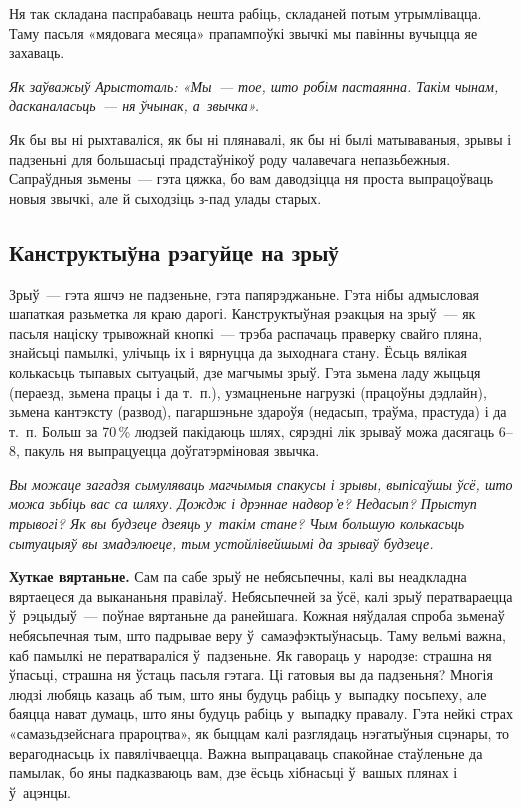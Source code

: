 Ня так складана паспрабаваць нешта рабіць, складаней потым утрымлівацца. Таму пасьля «мядовага месяца» прапампоўкі звычкі мы павінны вучыцца яе захаваць.

\emph{Як заўважыў Арыстоталь: «Мы~--- тое, што робім пастаянна. Такім чынам, дасканаласьць~--- ня ўчынак, а~звычка».}

Як бы вы ні рыхтаваліся, як бы ні плянавалі, як бы ні былі матываваныя, зрывы і падзеньні для большасьці прадстаўнікоў роду чалавечага непазьбежныя. Сапраўдныя зьмены~--- гэта цяжка, бо вам даводзіцца ня проста выпрацоўваць новыя звычкі, але й сыходзіць з-пад улады старых.

\subsection*{Канструктыўна рэагуйце на зрыў}

Зрыў~--- гэта яшчэ не падзеньне, гэта папярэджаньне. Гэта нібы адмысловая шапаткая разьметка ля краю дарогі. Канструктыўная рэакцыя на зрыў~--- як пасьля націску трывожнай кнопкі~--- трэба распачаць праверку свайго пляна, знайсьці памылкі, улічыць іх і вярнуцца да зыходнага стану. Ёсьць вялікая колькасьць тыпавых сытуацый, дзе магчымы зрыў. Гэта зьмена ладу жыцьця (пераезд, зьмена працы і да т.~п.), узмацненьне нагрузкі (працоўны дэдлайн), зьмена кантэксту (развод), пагаршэньне здароўя (недасып, траўма, прастуда) і да т.~п. Больш за 70\,\% людзей пакідаюць шлях, сярэдні лік зрываў можа дасягаць 6--8, пакуль ня выпрацуецца доўгатэрміновая звычка.

\emph{Вы можаце загадзя сымуляваць магчымыя спакусы і зрывы, выпісаўшы ўсё, што можа зьбіць вас са шляху. Дождж і дрэннае надвор'е? Недасып? Прыступ трывогі? Як вы будзеце дзеяць у~такім стане? Чым большую колькасьць сытуацыяў вы змадэлюеце, тым устойлівейшымі да зрываў будзеце.}

\textbf{Хуткае вяртаньне.} Сам па сабе зрыў не небясьпечны, калі вы неадкладна вяртаецеся да выкананьня правілаў. Небясьпечней за ўсё, калі зрыў ператвараецца ў~рэцыдыў~--- поўнае вяртаньне да ранейшага. Кожная няўдалая спроба зьменаў небясьпечная тым, што падрывае веру ў~самаэфэктыўнасьць. Таму вельмі важна, каб памылкі не ператвараліся ў~падзеньне. Як гавораць у~народзе: страшна ня ўпасьці, страшна ня ўстаць пасьля гэтага. Ці гатовыя вы да падзеньня? Многія людзі любяць казаць аб тым, што яны будуць рабіць у~выпадку посьпеху, але баяцца нават думаць, што яны будуць рабіць у~выпадку правалу. Гэта нейкі страх «самазьдзейснага прароцтва», як быццам калі разглядаць нэгатыўныя сцэнары, то верагоднасьць іх павялічваецца. Важна выпрацаваць спакойнае стаўленьне да памылак, бо яны падказваюць вам, дзе ёсьць хібнасьці ў~вашых плянах і ў~ацэнцы.

